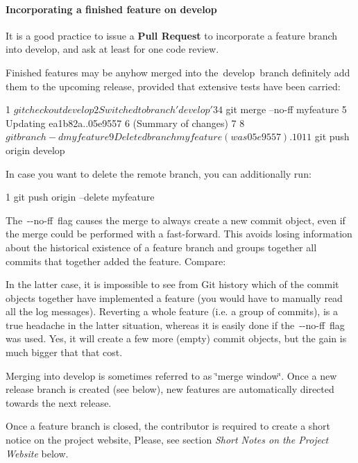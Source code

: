 \paragraph*{Incorporating a finished feature on {\ttfamily develop}}

It is a good practice to issue a {\bfseries Pull Request} to incorporate a feature branch into develop, and ask at least for one code review.

Finished features may be anyhow merged into the develop branch definitely add them to the upcoming release, provided that extensive tests have been carried\+:


\begin{DoxyCode}
1 $ git checkout develop
2 Switched to branch 'develop'
3 
4 $ git merge --no-ff myfeature
5 Updating ea1b82a..05e9557
6 (Summary of changes)
7 
8 $ git branch -d myfeature
9 Deleted branch myfeature (was 05e9557).
10 
11 $ git push origin develop
\end{DoxyCode}


In case you want to delete the remote branch, you can additionally run\+:


\begin{DoxyCode}
1 git push origin --delete myfeature
\end{DoxyCode}


The {\ttfamily -\/-\/no-\/ff} flag causes the merge to always create a new commit object, even if the merge could be performed with a fast-\/forward. This avoids losing information about the historical existence of a feature branch and groups together all commits that together added the feature. Compare\+:



In the latter case, it is impossible to see from Git history which of the commit objects together have implemented a feature (you would have to manually read all the log messages). Reverting a whole feature (i.\+e. a group of commits), is a true headache in the latter situation, whereas it is easily done if the {\ttfamily -\/-\/no-\/ff} flag was used. Yes, it will create a few more (empty) commit objects, but the gain is much bigger that that cost.

Merging into {\ttfamily develop} is sometimes referred to as \char`\"{}merge window\char`\"{}. Once a new release branch is created (see below), new features are automatically directed towards the next release.

Once a feature branch is closed, the contributor is required to create a short notice on the project website, Please, see section {\itshape Short Notes on the Project Website} below.

